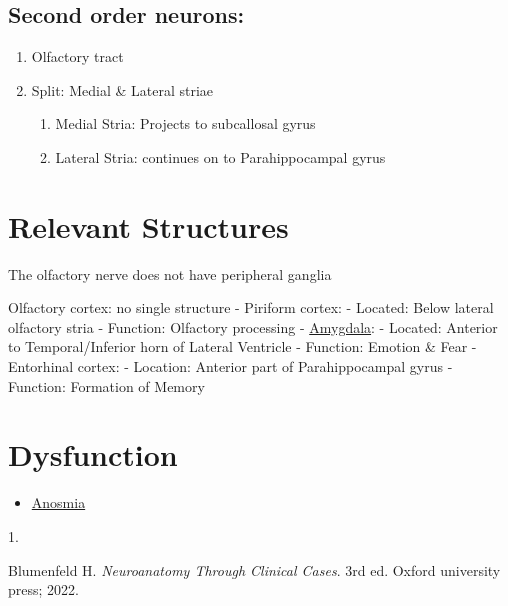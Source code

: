 \documentclass[
  letterpaper,
  DIV=11,
  numbers=noendperiod]{scrartcl}
\providecommand{\tightlist}{%
  \setlength{\itemsep}{0pt}\setlength{\parskip}{0pt}}\usepackage{longtable,booktabs,array}
\newlength{\cslhangindent}
\newlength{\csllabelwidth}
\newenvironment{CSLReferences}[2] %
 {\begin{list}{}{%
  \setlength{\itemindent}{0pt}
  \setlength{\leftmargin}{0pt}
  \setlength{\parsep}{0pt}
  \ifodd #1
   \setlength{\leftmargin}{\cslhangindent}
   \setlength{\itemindent}{-1\cslhangindent}
  \fi
  \setlength{\itemsep}{#2\baselineskip}}}
 {\end{list}}
\newcommand{\CSLLeftMargin}[1]{\parbox[t]{\csllabelwidth}{\strut#1\strut}}
\newcommand{\CSLRightInline}[1]{\parbox[t]{\linewidth - \csllabelwidth}{\strut#1\strut}}
\begin{document}
\subsection{Second order neurons:}\label{second-order-neurons}

\begin{enumerate}
\def\labelenumi{\arabic{enumi}.}
\tightlist
\item
  Olfactory tract
\item
  Split: Medial \& Lateral striae

  \begin{enumerate}
  \def\labelenumii{\arabic{enumii}.}
  \tightlist
  \item
    Medial Stria: Projects to subcallosal gyrus
  \item
    Lateral Stria: continues on to Parahippocampal gyrus
  \end{enumerate}
\end{enumerate}

\section{Relevant Structures}\label{relevant-structures}

The olfactory nerve does not have peripheral ganglia

Olfactory cortex: no single structure - Piriform cortex: - Located:
Below lateral olfactory stria - Function: Olfactory processing -
\href{../../../../Alchemy\%20Archive/Neuro/Neuroanatomy/Limbic\%20System/amygdala.qmd}{Amygdala}:
- Located: Anterior to Temporal/Inferior horn of Lateral Ventricle -
Function: Emotion \& Fear - Entorhinal cortex: - Location: Anterior part
of Parahippocampal gyrus - Function: Formation of Memory

\section{Dysfunction}\label{dysfunction}

\begin{itemize}
\tightlist
\item
  \href{../../../../Alchemy\%20Archive/Neuro/Neuroanatomy/Neurophysiology/Neuro\%20Symptoms/anosmia.qmd}{Anosmia}
\end{itemize}

\label{refs}
\begin{CSLReferences}{0}{1}
\CSLLeftMargin{1. }%
\CSLRightInline{Blumenfeld H. \emph{Neuroanatomy Through Clinical
Cases}. 3rd ed. {Oxford university press}; 2022.}

\end{CSLReferences}
\end{document}
